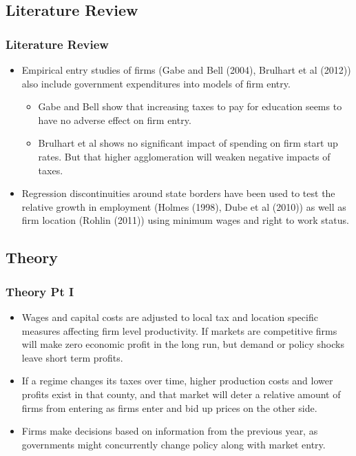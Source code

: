 \documentclass{beamer}
\begin{document}
\begin{frame}
\section{Literature Review}
\frametitle{Literature Review}
\begin{itemize}
\item Empirical entry studies of firms (Gabe and Bell (2004), Brulhart et al (2012)) also include government expenditures into models of firm entry.
\begin{itemize}
\item Gabe and Bell show that increasing taxes to pay for education seems to have no adverse effect on firm entry.
\item Brulhart et al shows no significant impact of spending on firm start up rates. But that higher agglomeration will weaken negative impacts of taxes.
\end{itemize}
\item Regression discontinuities around state borders have been used to test the relative growth in employment (Holmes (1998), Dube et al (2010)) as well as firm location (Rohlin (2011)) using minimum wages and right to work status.
\end{itemize}
\end{frame}

\begin{frame}
\section{Theory}
\frametitle{Theory Pt I}
\begin{itemize}
\item  Wages and capital costs are adjusted to local tax and location specific measures affecting firm level productivity. If markets are competitive firms will make zero economic profit in the long run, but demand or policy shocks leave short term profits.
\item If a regime changes its taxes over time, higher production costs and lower profits exist in that county, and that market will deter a relative amount of firms from entering as firms enter and bid up prices on the other side.
\item Firms make decisions based on information from the previous year, as governments might concurrently change policy along with market entry. 
\end{itemize}
\end{frame}
\end{document}
